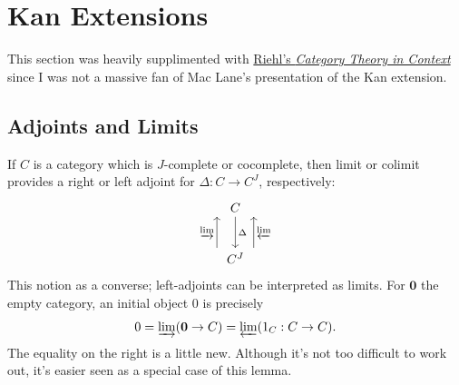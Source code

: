 \chapter{Kan Extensions}

This section was heavily supplimented with \href{https://math.jhu.edu/~eriehl/161/context.pdf}{Riehl's \emph{Category Theory in Context}} since I was not a massive fan of Mac Lane's presentation of the Kan extension.

\section{Adjoints and Limits}

If $C$ is a category which is $J$-complete or cocomplete, then limit or colimit provides a right or left adjoint for $\Delta : C \to C^J$, respectively:
\[\begin{tikzcd}[row sep = 2.5em, column sep = 2.5em]
C \ar[" \Delta ", d]  \\
C^J \ar[" \varprojlim  "', shift right=6, u] \ar[" \varinjlim  ", shift left=6, u] 
\end{tikzcd}\]
This notion as a converse; left-adjoints can be interpreted as limits. For $\mathbf{0} $ the empty category, an initial object $0$ is precisely
\[
	0=\varinjlim (\mathbf{0} \to C) = \varprojlim (1_C : C \to C)
.\]
The equality on the right is a little new. Although it's not too difficult to work out, it's easier seen as a special case of this lemma.

